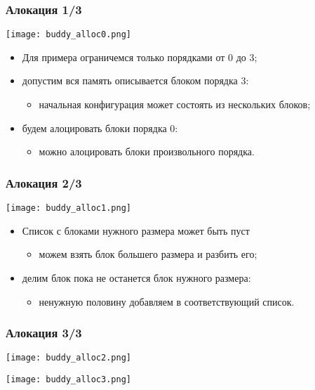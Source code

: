 \begin{frame}
\frametitle{Алокация 1/3}
\begin{center}
  \texttt{[image: buddy\_alloc0.png]}
\end{center}
\begin{itemize}
  \item Для примера ограничемся только порядками от 0 до 3;
  \item допустим вся память описывается блоком порядка 3:
  \begin{itemize}
    \item начальная конфигурация может состоять из нескольких блоков;
  \end{itemize}
  \item будем алоцировать блоки порядка 0:
  \begin{itemize}
    \item можно алоцировать блоки произвольного порядка.
  \end{itemize}
\end{itemize}
\end{frame}

\begin{frame}
\frametitle{Алокация 2/3}
\begin{center}
  \texttt{[image: buddy\_alloc1.png]}
\end{center}
\begin{itemize}
  \item Список с блоками нужного размера может быть пуст
  \begin{itemize}
    \item можем взять блок большего размера и разбить его;
  \end{itemize}
  \item делим блок пока не останется блок нужного размера:
  \begin{itemize}
    \item ненужную половину добавляем в соответствующий список.
  \end{itemize}
\end{itemize}
\end{frame}

\begin{frame}
\frametitle{Алокация 3/3}
\begin{center}
  \texttt{[image: buddy\_alloc2.png]}
\end{center}
\begin{center}
  \texttt{[image: buddy\_alloc3.png]}
\end{center}
\end{frame}

